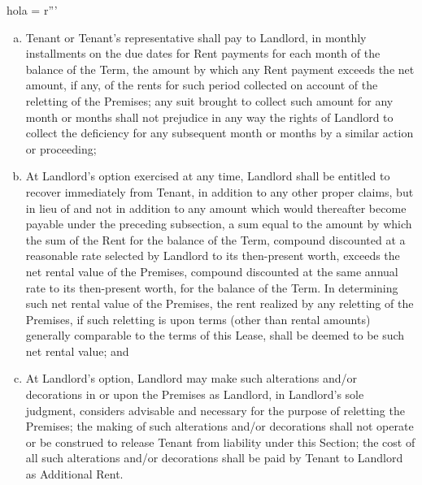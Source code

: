 hola = r'''\documentclass{article}
\begin{document}
\begin{enumerate}[(A)]
\begin{enumerate}[I]
\begin{enumerate}[(a)]
    \item Tenant or Tenant's representative shall pay to Landlord, in monthly installments on the due dates for Rent payments for each month of the balance of the Term, the amount by which any Rent payment exceeds the net amount, if any, of the rents for such period collected on account of the reletting of the Premises; any suit brought to collect such amount for any month or months shall not prejudice in any way the rights of Landlord to collect the deficiency for any subsequent month or months by a similar action or proceeding;

    \item At Landlord's option exercised at any time, Landlord shall be entitled to recover immediately from Tenant, in addition to any other proper claims, but in lieu of and not in addition to any amount which would thereafter become payable under the preceding subsection, a sum equal to the amount by which the sum of the Rent for the balance of the Term, compound discounted at a reasonable rate selected by Landlord to its then-present worth, exceeds the net rental value of the Premises, compound discounted at the same annual rate to its then-present worth, for the balance of the Term. In determining such net rental value of the Premises, the rent realized by any reletting of the Premises, if such reletting is upon terms (other than rental amounts) generally comparable to the terms of this Lease, shall be deemed to be such net rental value; and

    \item At Landlord's option, Landlord may make such alterations and/or decorations in or upon the Premises as Landlord, in Landlord's sole judgment, considers advisable and necessary for the purpose of reletting the Premises; the making of such alterations and/or decorations shall not operate or be construed to release Tenant from liability under this Section; the cost of all such alterations and/or decorations shall be paid by Tenant to Landlord as Additional Rent.


\end{enumerate}
\end{enumerate}
\end{enumerate}
\end{document}
